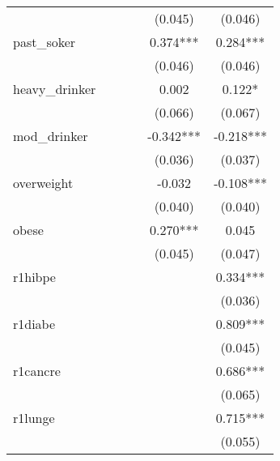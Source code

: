 {\begin{tabular}{l*{5}{c}}
                &               &               &               &     (0.045)   &     (0.046)   \\
past\_soker      &               &               &               &       0.374***&       0.284***\\
                &               &               &               &     (0.046)   &     (0.046)   \\
heavy\_drinker   &               &               &               &       0.002   &       0.122*  \\
                &               &               &               &     (0.066)   &     (0.067)   \\
mod\_drinker     &               &               &               &      -0.342***&      -0.218***\\
                &               &               &               &     (0.036)   &     (0.037)   \\
overweight      &               &               &               &      -0.032   &      -0.108***\\
                &               &               &               &     (0.040)   &     (0.040)   \\
obese           &               &               &               &       0.270***&       0.045   \\
                &               &               &               &     (0.045)   &     (0.047)   \\
r1hibpe         &               &               &               &               &       0.334***\\
                &               &               &               &               &     (0.036)   \\
r1diabe         &               &               &               &               &       0.809***\\
                &               &               &               &               &     (0.045)   \\
r1cancre        &               &               &               &               &       0.686***\\
                &               &               &               &               &     (0.065)   \\
r1lunge         &               &               &               &               &       0.715***\\
                &               &               &               &               &     (0.055)   \\

\end{tabular}}
